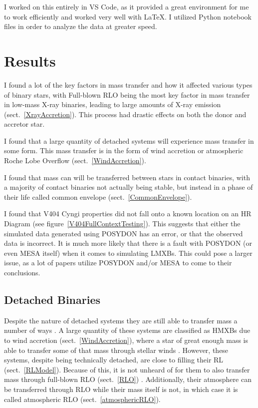 \documentclass[12pt, a4paper]{article}
\begin{document}
            I worked on this entirely in VS Code, as it provided a great environment for me to work efficiently and worked very well with \LaTeX. I utilized Python notebook files in order to analyze the data at greater speed.


\section{Results}
    I found a lot of the key factors in mass transfer and how it affected various types of binary stars, with Full-blown RLO being the most key factor in mass transfer in low-mass X-ray binaries, leading to large amounts of X-ray emission (sect.~\ref{XrayAccretion}). This process had drastic effects on both the donor and accretor star.

    I found that a large quantity of detached systems will experience mass transfer in some form. This mass transfer is in the form of wind accretion or atmospheric Roche Lobe Overflow (sect.~\ref{WindAccretion}).

    I found that mass can will be transferred between stars in contact binaries, with a majority of contact binaries not actually being stable, but instead in a phase of their life called common envelope (sect.~\ref{CommonEnvelope}).
    
    I found that V404 Cyngi properties did not fall onto a known location on an HR Diagram (see figure~\ref{V404FullContextTesting}). This suggests that either the simulated data generated using POSYDON has an error, or that the observed data is incorrect. It is much more likely that there is a fault with POSYDON (or even MESA itself) when it comes to simulating LMXBs. This could pose a larger issue, as a lot of papers utilize POSYDON and/or MESA to come to their conclusions. 
        
        \subsection{Detached Binaries}\label{sect:detachedResults}
            Despite the nature of detached systems they are still able to transfer mass a number of ways \parencite{TaurisvandenHeuvel+2023}. A large quantity of these systems are classified as HMXBs due to wind accretion (sect.~\ref{WindAccretion}), where a star of great enough mass is able to transfer some of that mass through stellar winds \parencite{TaurisvandenHeuvel+2023}. However, these systems, despite being technically detached, are close to filling their RL (sect.~\ref{RLModel}). Because of this, it is not unheard of for them to also transfer mass through full-blown RLO (sect.~\ref{RLO}) \parencite{TaurisvandenHeuvel+2023}. Additionally, their atmosphere can be transferred through RLO while their mass itself is not, in which case it is called atmospheric RLO (sect.~\ref{atmosphericRLO}). 
\end{document}
